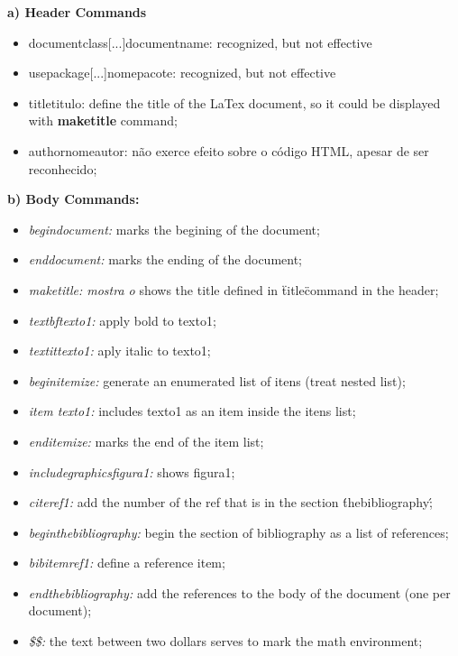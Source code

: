 \documentclass{article}
\begin{document}
\begin{itemzie}

	\item \textbf{a) Header Commands}
		\begin{itemize}
			 \item documentclass[...]{documentname}: recognized, but not effective
			 \item usepackage[...]{nomepacote}:  recognized, but not effective
			 \item title{titulo}: define the title of the LaTex document, so it could be displayed with \textbf{maketitle} command;
			 \item author{nomeautor}: não exerce efeito sobre o código HTML, apesar de ser reconhecido;
		\end{itemize}

	\item \textbf{b) Body Commands:}
		\begin{itemize}
	 		\item \textit{begin{document}:} marks the begining of the document;
	 		\item \textit{end{document}:} marks the ending of the document;
	 		\item \textit{maketitle: mostra o} shows the title defined in \"title\" command in the header;
	 		\item \textit{textbf{texto1}:} apply bold to texto1;
	 		\item \textit{textit{texto1}:} aply italic to texto1;
	 		\item \textit{begin{itemize}:} generate an enumerated list of itens (treat nested list);
	 		\item \textit{item texto1:} includes texto1 as an item inside the itens list; 
	 		\item \textit{end{itemize}:} marks the end of the item list;
	 		\item \textit{includegraphics{figura1}:} shows figura1;
	 		\item \textit{cite{ref1}:} add the number of the ref that is in the section \'thebibliography\';
	 		\item \textit{begin{thebibliography}:} begin the section of bibliography as a list of references;
	 		\item \textit{bibitem{ref1}:} define a reference item;
	 		\item \textit{end{thebibliography}:} add the references to the body of the document (one per document);
	 		\item \textit{\$\$:} the text between two dollars serves to mark the math environment;
		\end{itemize}


\end{itemzie}
\end{document}
